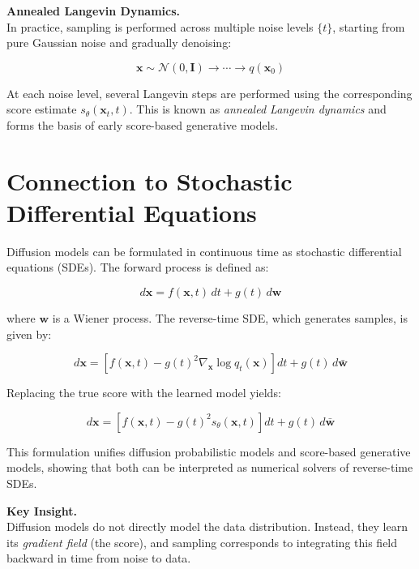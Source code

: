 \vspace{0.5em}
\noindent
\textbf{Annealed Langevin Dynamics.} \\
In practice, sampling is performed across multiple noise levels $\{t\}$, starting from pure Gaussian noise and gradually denoising:

\begin{equation}
\mathbf{x} \sim \mathcal{N}(0, \mathbf{I}) \rightarrow \cdots \rightarrow q(\mathbf{x}_0)
\end{equation}

At each noise level, several Langevin steps are performed using the corresponding score estimate $s_\theta(\mathbf{x}_t, t)$. This is known as \textit{annealed Langevin dynamics} and forms the basis of early score-based generative models.

\section{Connection to Stochastic Differential Equations}

Diffusion models can be formulated in continuous time as stochastic differential equations (SDEs). The forward process is defined as:

\begin{equation}
d\mathbf{x} = f(\mathbf{x}, t)\,dt + g(t)\,d\mathbf{w}
\end{equation}

where $\mathbf{w}$ is a Wiener process. The reverse-time SDE, which generates samples, is given by:

\begin{equation}
d\mathbf{x} =
\left[
f(\mathbf{x}, t) - g(t)^2 \nabla_{\mathbf{x}} \log q_t(\mathbf{x})
\right] dt
+
g(t)\,d\bar{\mathbf{w}}
\end{equation}

Replacing the true score with the learned model yields:

\begin{equation}
d\mathbf{x} =
\left[
f(\mathbf{x}, t) - g(t)^2 s_\theta(\mathbf{x}, t)
\right] dt
+
g(t)\,d\bar{\mathbf{w}}
\end{equation}

This formulation unifies diffusion probabilistic models and score-based generative models, showing that both can be interpreted as numerical solvers of reverse-time SDEs.

\vspace{0.5em}
\noindent
\textbf{Key Insight.} \\
Diffusion models do not directly model the data distribution. Instead, they learn its \textit{gradient field} (the score), and sampling corresponds to integrating this field backward in time from noise to data.


